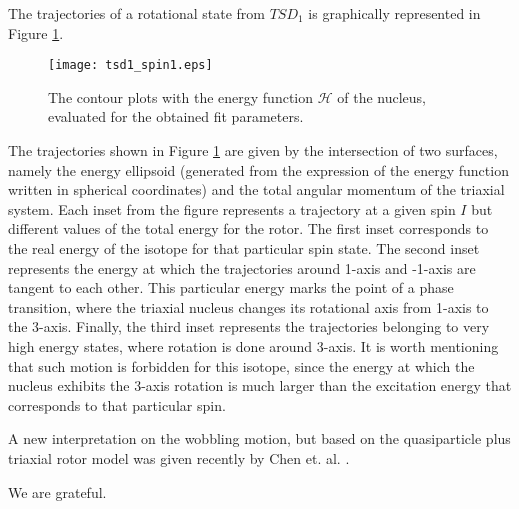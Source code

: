 \documentclass[myclassdoc,debug]{rjparticle}
\begin{document}
The trajectories of a rotational state from $TSD_1$  is graphically represented in Figure \ref{trajectory}.

\begin{figure}[ht]
    \centering
    \texttt{[image: tsd1\_spin1.eps]}
    \caption{The contour plots with the energy function $\mathcal{H}$ of the nucleus, evaluated for the obtained fit parameters.}
    \label{trajectory}
\end{figure}

The trajectories shown in Figure \ref{trajectory} are given by the intersection of two surfaces, namely the energy ellipsoid (generated from the expression of the energy function written in spherical coordinates) and the total angular momentum of the triaxial system. Each inset from the figure represents a trajectory at a given spin $I$ but different values of the total energy for the rotor. The first inset corresponds to the real energy of the isotope for that particular spin state. The second inset represents the energy at which the trajectories around 1-axis and -1-axis are tangent to each other. This particular energy marks the point of a phase transition, where the triaxial nucleus changes its rotational axis from 1-axis to the 3-axis. Finally, the third inset represents the trajectories belonging to very high energy states, where rotation is done around 3-axis. It is worth mentioning that such motion is forbidden for this isotope, since the energy at which the nucleus exhibits the 3-axis rotation is much larger than the excitation energy that corresponds to that particular spin.

A new interpretation on the wobbling motion, but based on the quasiparticle plus triaxial rotor model was given recently by Chen et. al. \cite{chen2020interpretation}.

\begin{acknowledgement}
We are grateful.
\end{acknowledgement}


\end{document}
